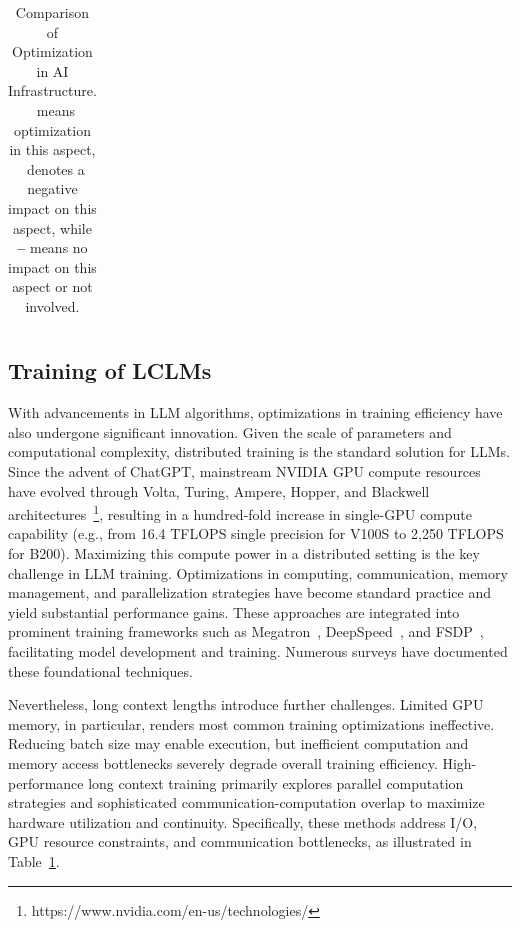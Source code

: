 \documentclass[11pt, a4paper, logo, copyright, nonumbering]{map}
\newcommand{\Checkmark}{\ding{51}} %
\newcommand{\XSolidBrush}{\ding{55}} %
\begin{document}
\begin{table}[!htp]
{\begin{tabular}{c|cccc}
 \bottomrule
\end{tabular}
}
\caption{Comparison of Optimization in AI Infrastructure. \Checkmark~means optimization in this aspect, \XSolidBrush~denotes a negative impact on this aspect, while \textbf{--} means no impact on this aspect or not involved.}
\label{tab:infra_stats}
\end{table}

\subsection{Training of LCLMs}

With advancements in LLM algorithms, optimizations in training efficiency have also undergone significant innovation.
Given the scale of parameters and computational complexity, distributed training is the standard solution for LLMs.
Since the advent of ChatGPT, mainstream NVIDIA GPU compute resources have evolved through Volta, Turing, Ampere, Hopper, and Blackwell architectures~\footnote{https://www.nvidia.com/en-us/technologies/}, resulting in a hundred-fold increase in single-GPU compute capability (e.g., from 16.4 TFLOPS single precision for V100S to 2,250 TFLOPS for B200).
Maximizing this compute power in a distributed setting is the key challenge in LLM training.
Optimizations in computing, communication, memory management, and parallelization strategies have become standard practice and yield substantial performance gains.
These approaches are integrated into prominent training frameworks such as Megatron~\cite{shoeybi2019megatron}, DeepSpeed~\cite{rasley2020deepspeed}, and FSDP~\cite{zhao2023pytorch}, facilitating model development and training.
Numerous surveys \cite{liu2024understanding,duan2024efficient,brakel2024model} have documented these foundational techniques.

Nevertheless, long context lengths introduce further challenges.
Limited GPU memory, in particular, renders most common training optimizations ineffective.
Reducing batch size may enable execution, but inefficient computation and memory access bottlenecks severely degrade overall training efficiency.
High-performance long context training primarily explores parallel computation strategies and sophisticated communication-computation overlap to maximize hardware utilization and continuity.
Specifically, these methods address I/O, GPU resource constraints, and communication bottlenecks, as illustrated in Table~\ref{tab:infra_stats}.
\end{document}
